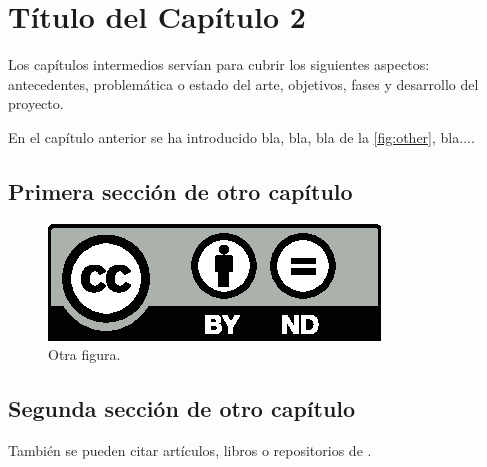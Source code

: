\chapter{Título del Capítulo 2}
\label{chapter:dos}

\noindent Los capítulos intermedios servían para cubrir los siguientes aspectos: antecedentes, problemática o estado del arte, objetivos, fases y desarrollo del proyecto.

En el capítulo anterior se ha introducido bla, bla, bla de la \autoref{fig:other}, bla....

\section{Primera sección de otro capítulo}

\begin{figure}[htb]
   \centering
   \includegraphics[width=0.5\linewidth]{images/licenses/by-nd}
   \caption{Otra figura.}
   \label{fig:other}
\end{figure}

\section{Segunda sección de otro capítulo}

También se pueden citar artículos\parencite{examplearticle}, libros o repositorios de \cite{examplegithub}.